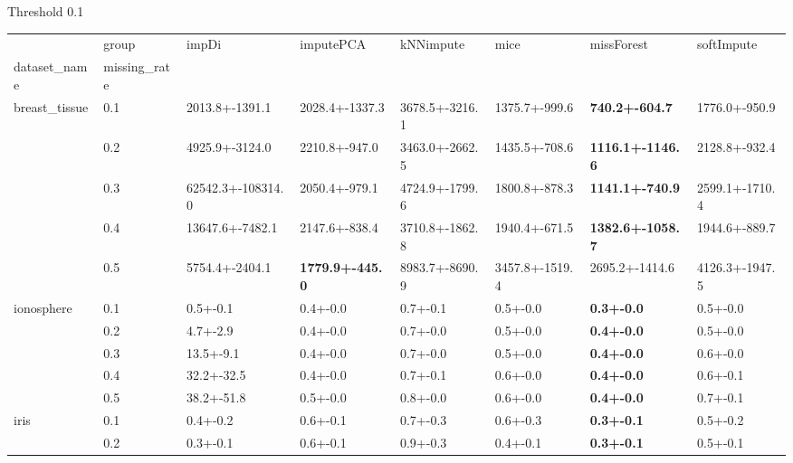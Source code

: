  Threshold 0.1 
 \begin{tabular}{llllllll}
\toprule
     & group &              impDi &               imputePCA &       kNNimpute &            mice &               missForest &      softImpute \\
dataset_name & missing_rate &                    &                         &                 &                 &                          &                 \\
\midrule
breast_tissue & 0.1 &     2013.8+-1391.1 &          2028.4+-1337.3 &  3678.5+-3216.1 &   1375.7+-999.6 &    \textbf{740.2+-604.7} &   1776.0+-950.9 \\
     & 0.2 &     4925.9+-3124.0 &           2210.8+-947.0 &  3463.0+-2662.5 &   1435.5+-708.6 &  \textbf{1116.1+-1146.6} &   2128.8+-932.4 \\
     & 0.3 &  62542.3+-108314.0 &           2050.4+-979.1 &  4724.9+-1799.6 &   1800.8+-878.3 &   \textbf{1141.1+-740.9} &  2599.1+-1710.4 \\
     & 0.4 &    13647.6+-7482.1 &           2147.6+-838.4 &  3710.8+-1862.8 &   1940.4+-671.5 &  \textbf{1382.6+-1058.7} &   1944.6+-889.7 \\
     & 0.5 &     5754.4+-2404.1 &  \textbf{1779.9+-445.0} &  8983.7+-8690.9 &  3457.8+-1519.4 &           2695.2+-1414.6 &  4126.3+-1947.5 \\
ionosphere & 0.1 &           0.5+-0.1 &                0.4+-0.0 &        0.7+-0.1 &        0.5+-0.0 &        \textbf{0.3+-0.0} &        0.5+-0.0 \\
     & 0.2 &           4.7+-2.9 &                0.4+-0.0 &        0.7+-0.0 &        0.5+-0.0 &        \textbf{0.4+-0.0} &        0.5+-0.0 \\
     & 0.3 &          13.5+-9.1 &                0.4+-0.0 &        0.7+-0.0 &        0.5+-0.0 &        \textbf{0.4+-0.0} &        0.6+-0.0 \\
     & 0.4 &         32.2+-32.5 &                0.4+-0.0 &        0.7+-0.1 &        0.6+-0.0 &        \textbf{0.4+-0.0} &        0.6+-0.1 \\
     & 0.5 &         38.2+-51.8 &                0.5+-0.0 &        0.8+-0.0 &        0.6+-0.0 &        \textbf{0.4+-0.0} &        0.7+-0.1 \\
iris & 0.1 &           0.4+-0.2 &                0.6+-0.1 &        0.7+-0.3 &        0.6+-0.3 &        \textbf{0.3+-0.1} &        0.5+-0.2 \\
     & 0.2 &           0.3+-0.1 &                0.6+-0.1 &        0.9+-0.3 &        0.4+-0.1 &        \textbf{0.3+-0.1} &        0.5+-0.1 \\

\end{tabular}
